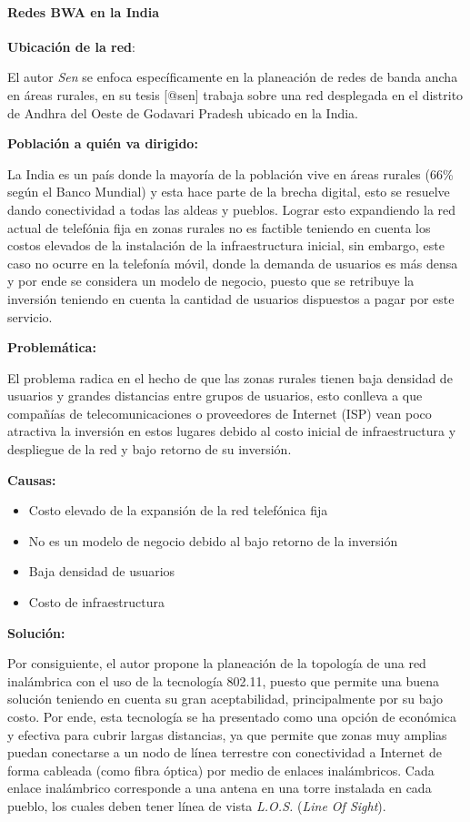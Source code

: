 \documentclass[]{article}
\providecommand{\tightlist}{%
  \setlength{\itemsep}{0pt}\setlength{\parskip}{0pt}}
\let\oldparagraph\paragraph
\renewcommand{\paragraph}[1]{\oldparagraph{#1}\mbox{}}
\begin{document}
\paragraph{Redes BWA en la India}\label{redes-bwa-en-la-india}

\textbf{Ubicación de la red}:

El autor \emph{Sen} se enfoca específicamente en la planeación de redes
de banda ancha en áreas rurales, en su tesis {[}@sen{]} trabaja sobre
una red desplegada en el distrito de Andhra del Oeste de Godavari
Pradesh ubicado en la India.

\textbf{Población a quién va dirigido:}

La India es un país donde la mayoría de la población vive en áreas
rurales (66\% según el Banco Mundial) y esta hace parte de la brecha
digital, esto se resuelve dando conectividad a todas las aldeas y
pueblos. Lograr esto expandiendo la red actual de telefónia fija en
zonas rurales no es factible teniendo en cuenta los costos elevados de
la instalación de la infraestructura inicial, sin embargo, este caso no
ocurre en la telefonía móvil, donde la demanda de usuarios es más densa
y por ende se considera un modelo de negocio, puesto que se retribuye la
inversión teniendo en cuenta la cantidad de usuarios dispuestos a pagar
por este servicio.

\textbf{Problemática:}

El problema radica en el hecho de que las zonas rurales tienen baja
densidad de usuarios y grandes distancias entre grupos de usuarios, esto
conlleva a que compañías de telecomunicaciones o proveedores de Internet
(ISP) vean poco atractiva la inversión en estos lugares debido al costo
inicial de infraestructura y despliegue de la red y bajo retorno de su
inversión.

\textbf{Causas:}

\begin{itemize}
\tightlist
\item
  Costo elevado de la expansión de la red telefónica fija
\item
  No es un modelo de negocio debido al bajo retorno de la inversión
\item
  Baja densidad de usuarios
\item
  Costo de infraestructura
\end{itemize}

\textbf{Solución:}

Por consiguiente, el autor propone la planeación de la topología de una
red inalámbrica con el uso de la tecnología 802.11, puesto que permite
una buena solución teniendo en cuenta su gran aceptabilidad,
principalmente por su bajo costo. Por ende, esta tecnología se ha
presentado como una opción de económica y efectiva para cubrir largas
distancias, ya que permite que zonas muy amplias puedan conectarse a un
nodo de línea terrestre con conectividad a Internet de forma cableada
(como fibra óptica) por medio de enlaces inalámbricos. Cada enlace
inalámbrico corresponde a una antena en una torre instalada en cada
pueblo, los cuales deben tener línea de vista \emph{L.O.S.} (\emph{Line
Of Sight}).
\end{document}
